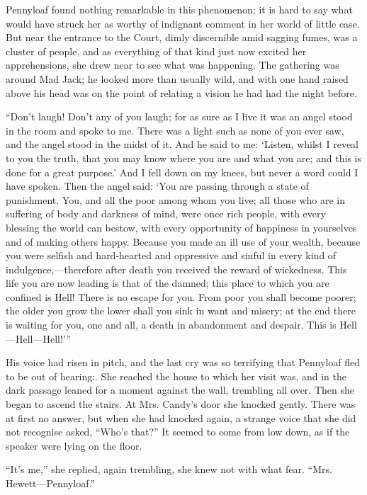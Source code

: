 Pennyloaf found nothing remarkable in this phenomenon; it is hard to say
what would have struck her as worthy of indignant comment in her world
of little ease. But near the entrance to the Court, dimly discernible
amid sagging fumes, was a cluster of people, and as everything of that
kind just now excited her apprehensions, she drew near to see what was
happening. The gathering was around Mad Jack; he looked more than
usually wild, and with one hand raised above his head was {}on the point
of relating a vision he had had the night before.

``Don't laugh! Don't any of you laugh; for as sure as I live it was an
angel stood in the room and spoke to me. There was a light such as none
of you ever saw, and the angel stood in the midst of it. And he said to
me: `Listen, whilst I reveal to you the truth, that you may know where
you are and what you are; and this is done for a great purpose.' And I
fell down on my knees, but never a word could I have spoken. Then the
angel said: `You are passing through a state of punishment. You, and all
the poor among whom you live; all those who are in suffering of body and
darkness of mind, were once rich people, with every blessing the world
can bestow, with every opportunity of happiness in yourselves and of
making others happy. Because you made an ill use of your wealth, because
you were selfish and hard-hearted and oppressive and sinful in every
kind of indulgence,---therefore after death you received the reward of
wickedness. This life you are now leading is that of the damned; this
place to which you are confined is Hell! There is no escape for {}you.
From poor you shall become poorer; the older you grow the lower shall
you sink in want and misery; at the end there is waiting for you, one
and all, a death in abandonment and despair. This is
Hell---Hell---Hell!'''

His voice had risen in pitch, and the last cry was so terrifying that
Pennyloaf fled to be out of hearing:. She reached the house to which her
visit was, and in the dark passage leaned for a moment against the wall,
trembling all over. Then she began to ascend the stairs. At Mrs. Candy's
door she knocked gently. There was at first no answer, but when she had
knocked again, a strange voice that she did not recognise asked, ``Who's
that?'' It seemed to come from low down, as if the speaker were lying on
the floor.

``It's me,'' she replied, again trembling, she knew not with what fear.
``Mrs. Hewett---Pennyloaf.''

